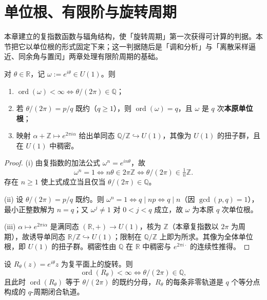 \section{单位根、有限阶与旋转周期}
\label{sec:unit_roots_rotation_period}

本章建立的复指数函数与辐角结构，使「旋转周期」第一次获得可计算的判据。本节把它以单位根的形式固定下来；这一判据随后是「调和分析」与「离散采样逼近、同余角与置闰」两章处理有限阶周期的基础。

\begin{proposition}[复指数的有限阶判据]\label{prop:complex_exp_finite_order}
对 $\theta\in\mathbb{R}$，记 $\omega:=e^{i\theta}\in U(1)$。则
\begin{enumerate}[label=(\roman*)]
    \item $\operatorname{ord}(\omega)<\infty\iff\theta/(2\pi)\in\mathbb{Q}$；
    \item 若 $\theta/(2\pi)=p/q$ 既约（$q\ge1$），则 $\operatorname{ord}(\omega)=q$，且 $\omega$ 是 $q$ 次\textbf{本原单位根}；
    \item 映射 $\alpha+\mathbb{Z}\mapsto e^{2\pi i\alpha}$ 给出单同态 $\mathbb{Q}/\mathbb{Z}\hookrightarrow U(1)$，其像为 $U(1)$ 的扭子群，且在 $U(1)$ 中稠密。
\end{enumerate}
\end{proposition}

\begin{proof}
(i) 由复指数的加法公式 $\omega^n=e^{in\theta}$，故
\[
\omega^n=1\iff n\theta\in2\pi\mathbb{Z}\iff \theta/(2\pi)\in\tfrac1n\mathbb{Z}.
\]
存在 $n\ge1$ 使上式成立当且仅当 $\theta/(2\pi)\in\mathbb{Q}$。

(ii) 设 $\theta/(2\pi)=p/q$ 既约。则 $\omega^n=1\iff q\mid np\iff q\mid n$（因 $\gcd(p,q)=1$），最小正整数解为 $n=q$；又 $\omega^j\neq1$ 对 $0<j<q$ 成立，故 $\omega$ 为本原 $q$ 次单位根。

(iii) $\alpha\mapsto e^{2\pi i\alpha}$ 是满同态 $(\mathbb{R},+)\to U(1)$，核为 $\mathbb{Z}$（本章复指数以 $2\pi$ 为周期），故诱导单同态 $\mathbb{R}/\mathbb{Z}\hookrightarrow U(1)$；限制在 $\mathbb{Q}/\mathbb{Z}$ 上即为所求。其像为全体单位根，即 $U(1)$ 的扭子群。稠密性由 $\mathbb{Q}$ 在 $\mathbb{R}$ 中稠密与 $e^{2\pi i\cdot}$ 的连续性推得。
\end{proof}

\begin{corollary}\label{cor:rational_angle_finite_order}
设 $R_\theta(z)=e^{i\theta}z$ 为复平面上的旋转。则
\[
\operatorname{ord}(R_\theta)<\infty\iff\theta/(2\pi)\in\mathbb{Q},
\]
且此时 $\operatorname{ord}(R_\theta)$ 等于 $\theta/(2\pi)$ 的既约分母，$R_\theta$ 的每条非零轨道是 $q$ 个等分点构成的 $q$-周期闭合轨道。
\end{corollary}

